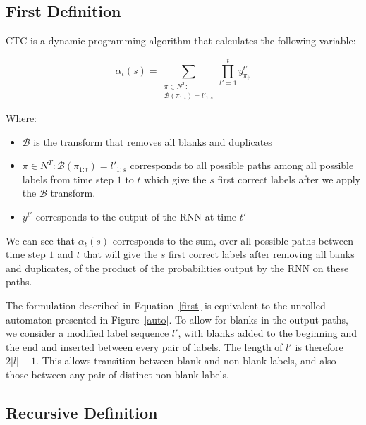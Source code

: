 \documentclass[11pt,a4paper]{article}
\begin{document}
\subsection{First Definition}

CTC is a dynamic programming algorithm that calculates the following variable:

\begin{equation}
    \alpha_t(s) = \sum_{\substack{\pi \in N^T:\\\mathcal{B}(\pi_{1:t}) = l'_{1:s}}}              \prod_{t'=1}^t y_{\pi_{t'}}^{t'} 
    \label{first}   
\end{equation}

Where: 
\begin{itemize}
    \item $\mathcal{B}$ is the transform that removes all blanks and duplicates
    \item $\pi \in N^T: \mathcal{B}(\pi_{1:t}) = l'_{1:s}$ corresponds to all possible paths among all possible labels from time step $1$ to $t$ which give the $s$ first correct labels after we apply the $\mathcal{B}$ transform.
    \item $y^{t'}$ corresponds to the output of the RNN at time $t'$ 
\end{itemize}

We can see that $\alpha_t(s)$ corresponds to the sum, over all possible paths between time step $1$ and $t$ that will give the $s$ first correct labels after removing all banks and duplicates, of the product of the probabilities output by the RNN on these paths.

The formulation described in Equation~\ref{first} is equivalent to the unrolled automaton presented in Figure~\ref{auto}. 
To allow for blanks in the output paths, we consider a modified label sequence $l'$, with blanks added to the beginning and the end and inserted between every pair of labels. The length of $l'$ is therefore $2|l|+1$. This allows transition  between blank and non-blank labels, and also those between any pair of distinct non-blank labels.



\subsection{Recursive Definition}
\end{document}
